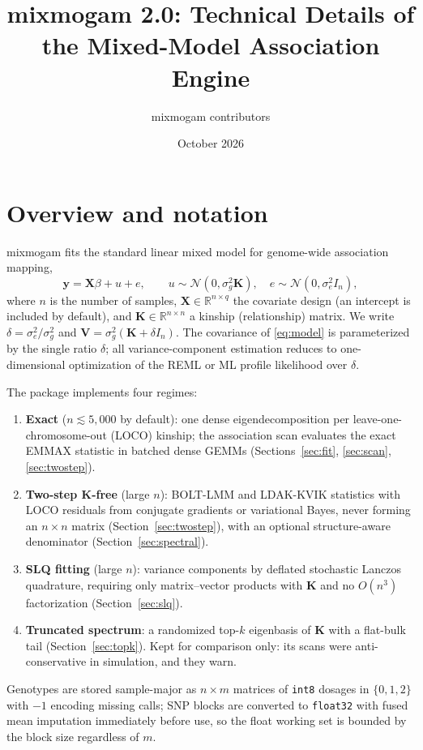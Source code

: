 \documentclass[11pt]{article}
\title{mixmogam 2.0: Technical Details of the Mixed-Model Association Engine}
\author{mixmogam contributors}
\date{October 2026}
\newcommand{\y}{\mathbf{y}}
\newcommand{\K}{\mathbf{K}}
\newcommand{\X}{\mathbf{X}}
\newcommand{\V}{\mathbf{V}}
\newcommand{\R}{\mathbb{R}}
\begin{document}
\maketitle

\section{Overview and notation}

mixmogam fits the standard linear mixed model for genome-wide
association mapping,
\begin{equation}
  \y = \X\beta + u + e, \qquad
  u \sim \mathcal{N}(0, \sigma_g^2 \K), \quad
  e \sim \mathcal{N}(0, \sigma_e^2 I_n),
  \label{eq:model}
\end{equation}
where $n$ is the number of samples, $\X \in \R^{n\times q}$ the
covariate design (an intercept is included by default), and
$\K \in \R^{n\times n}$ a kinship (relationship) matrix. We write
$\delta = \sigma_e^2/\sigma_g^2$ and
$\V = \sigma_g^2(\K + \delta I_n)$. The covariance of \eqref{eq:model}
is parameterized by the single ratio $\delta$; all variance-component
estimation reduces to one-dimensional optimization of the REML or ML
profile likelihood over $\delta$.

The package implements four regimes:
\begin{enumerate}[nosep]
  \item \textbf{Exact} ($n \lesssim 5{,}000$ by default): one dense
        eigendecomposition per leave-one-chromosome-out (LOCO) kinship;
        the association scan evaluates the exact EMMAX statistic in
        batched dense GEMMs (Sections~\ref{sec:fit}, \ref{sec:scan},
        \ref{sec:twostep}).
  \item \textbf{Two-step K-free} (large $n$): BOLT-LMM and LDAK-KVIK
        statistics with LOCO residuals from conjugate gradients or
        variational Bayes, never forming an $n\times n$ matrix
        (Section~\ref{sec:twostep}), with an optional structure-aware
        denominator (Section~\ref{sec:spectral}).
  \item \textbf{SLQ fitting} (large $n$): variance components by
        deflated stochastic Lanczos quadrature, requiring only
        matrix--vector products with $\K$ and no $O(n^3)$
        factorization (Section~\ref{sec:slq}).
  \item \textbf{Truncated spectrum}: a randomized top-$k$ eigenbasis of
        $\K$ with a flat-bulk tail (Section~\ref{sec:topk}). Kept for
        comparison only: its scans were anti-conservative in
        simulation, and they warn.
\end{enumerate}
Genotypes are stored sample-major as $n \times m$ matrices of
\texttt{int8} dosages in $\{0,1,2\}$ with $-1$ encoding missing calls;
SNP blocks are converted to \texttt{float32} with fused mean
imputation immediately before use, so the float working set is bounded
by the block size regardless of $m$.
\end{document}
